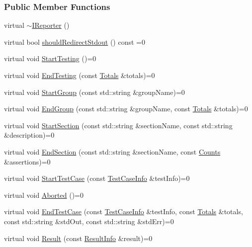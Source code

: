 \subsubsection*{Public Member Functions}
\begin{DoxyCompactItemize}
\item 
virtual \hyperlink{structCatch_1_1IReporter_a0b9fdd30ff00c141af9df74821472c8c}{$\sim$\-I\-Reporter} ()
\item 
virtual bool \hyperlink{structCatch_1_1IReporter_aebd8c20478de29bba9b5a9f3845c18dc}{should\-Redirect\-Stdout} () const =0
\item 
virtual void \hyperlink{structCatch_1_1IReporter_afcf38d6ff912a9b2c7f07da45fcd5cb1}{Start\-Testing} ()=0
\item 
virtual void \hyperlink{structCatch_1_1IReporter_a26790d01ce89a9cededdea3de8dd2435}{End\-Testing} (const \hyperlink{structCatch_1_1Totals}{Totals} \&totals)=0
\item 
virtual void \hyperlink{structCatch_1_1IReporter_a376da40f5a20d5902393de93b367d70f}{Start\-Group} (const std\-::string \&group\-Name)=0
\item 
virtual void \hyperlink{structCatch_1_1IReporter_a4f535483a2b67ea035149bbb3cef329f}{End\-Group} (const std\-::string \&group\-Name, const \hyperlink{structCatch_1_1Totals}{Totals} \&totals)=0
\item 
virtual void \hyperlink{structCatch_1_1IReporter_adb0142a05b8fc99386a638515e2af388}{Start\-Section} (const std\-::string \&section\-Name, const std\-::string \&description)=0
\item 
virtual void \hyperlink{structCatch_1_1IReporter_a1d30e7c58ff3de2ae04d1741c80a74b2}{End\-Section} (const std\-::string \&section\-Name, const \hyperlink{structCatch_1_1Counts}{Counts} \&assertions)=0
\item 
virtual void \hyperlink{structCatch_1_1IReporter_a7951546119b0873f2f81cdaa61f3c60f}{Start\-Test\-Case} (const \hyperlink{classCatch_1_1TestCaseInfo}{Test\-Case\-Info} \&test\-Info)=0
\item 
virtual void \hyperlink{structCatch_1_1IReporter_a00d9d8bedcf32e5fdeed12b620b7ff7e}{Aborted} ()=0
\item 
virtual void \hyperlink{structCatch_1_1IReporter_a294e878c40061753eda12e326db31ec8}{End\-Test\-Case} (const \hyperlink{classCatch_1_1TestCaseInfo}{Test\-Case\-Info} \&test\-Info, const \hyperlink{structCatch_1_1Totals}{Totals} \&totals, const std\-::string \&std\-Out, const std\-::string \&std\-Err)=0
\item 
virtual void \hyperlink{structCatch_1_1IReporter_af3b99aa32bc7f92e3d6bf1e04ec1a5ee}{Result} (const \hyperlink{classCatch_1_1ResultInfo}{Result\-Info} \&result)=0
\end{DoxyCompactItemize}
